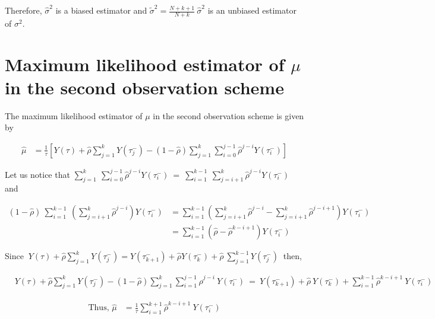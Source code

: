 \begin{appendices}
\label{appendix:bsig1}

\hspace{2 mm} Therefore, $\hat\sigma^2$ is a biased estimator and $\tilde{\sigma}^2={\displaystyle\frac{ N+k+1}{N+k}}\ \hat\sigma^2$ is an unbiased estimator of $\sigma^2$.

\section{Maximum likelihood estimator of $\mu$ in the second observation scheme}
\label{appendix:mle_mu2}
The maximum likelihood estimator of $\mu$ in the second observation scheme is given by 


\begin{align*}
\hat{\mu}& = \frac{1}{\tau} \left[ Y(\tau)+ \hat{\rho} \sum\limits_{j=1}^{k} Y(\tau_j^-) -(1-\hat{\rho})\sum\limits_{j=1}^{k} \sum\limits_{i=0}^{j-1}\hat{\rho}^{j-i}Y(\tau_i^-)\right] 
\end{align*}

Let us notice that $\sum\limits_{j=1 }^{k}\ \sum\limits_{i=0}^{j-1}\hat{\rho}^{j-i}Y(\tau_i^-)\ =\ \sum\limits_{i=1}^{k-1} \ \sum\limits_{j=i+1}^{k}\hat{\rho}^{j-i}Y(\tau_i^-)$ and

\begin{align*}
(1-\hat\rho)\ \sum\limits_{i=1}^{k-1} \ \left(\sum\limits_{j=i+1}^{k}\hat{\rho}^{j-i}\right)Y(\tau_i^-)&=\sum\limits_{i=1}^{k-1}  \left(\sum\limits_{j=i+1}^{k}\hat{\rho}^{j-i} -\sum\limits_{j=i+1}^{k} \hat{\rho}^{j-i+1}\right) Y(\tau_i^-)\\
&=\sum\limits_{i=1}^{k-1} (\hat\rho -\hat\rho^{k-i+1}) Y(\tau_i^-)
\end{align*}

Since $\ Y(\tau)+ \hat{\rho} \sum\limits_{j=1}^{k} Y(\tau_j^-)=Y(\tau_{k+1}^-)+ \hat{\rho}  Y(\tau_k^-)+\hat\rho\ \sum\limits_{j=1}^{k-1} Y(\tau_j^-)\ $ then,

\begin{align*}
&Y(\tau)+ \hat{\rho} \sum\limits_{j=1}^{k} Y(\tau_j^-) -(1-\hat{\rho})\sum\limits_{j=1}^{k} \sum\limits_{i=1}^{j-1}\hat{\rho}^{j-i}\ Y(\tau_i^-)\ =\ Y(\tau_{k+1}^-)+ \hat{\rho} \  Y(\tau_k^-)+\sum\limits_{i=1}^{k-1} \hat\rho^{k-i+1}\  Y(\tau_i^-)
\end{align*}

\begin{align*}
\text{Thus, } \hat{\mu}& = \frac{1}{\tau}  \sum\limits_{i=1}^{k+1}  \hat\rho^{k-i+1}\  Y(\tau_i^-)
\end{align*}




\end{appendices}
